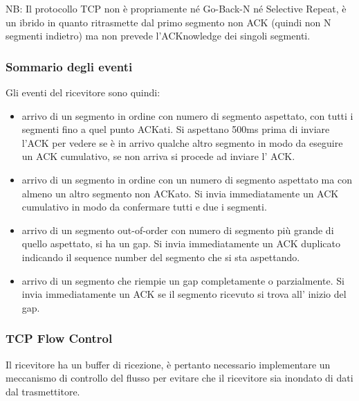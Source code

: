 NB: Il protocollo TCP non è propriamente né Go-Back-N né Selective Repeat, è un ibrido in quanto ritrasmette dal primo segmento non ACK (quindi non N segmenti indietro) ma non prevede l'ACKnowledge dei singoli segmenti.

\subsubsection{Sommario degli eventi}
Gli eventi del ricevitore sono quindi:
\begin{itemize}
    \item arrivo di un segmento in ordine con numero di segmento aspettato, con tutti i segmenti fino a quel punto ACKati.
    Si aspettano 500ms prima di inviare l'ACK per vedere se è in arrivo qualche altro segmento in modo da eseguire un ACK cumulativo, se non arriva si procede ad inviare l' ACK.

    \item arrivo di un segmento in ordine con un numero di segmento aspettato ma con almeno un altro segmento non ACKato.
    Si invia immediatamente un ACK cumulativo in modo da confermare tutti e due i segmenti.

    \item arrivo di un segmento out-of-order con numero di segmento più grande di quello aspettato, si ha un gap.
    Si invia immediatamente un ACK duplicato indicando il sequence number del segmento che si sta aspettando.
    
    \item arrivo di un segmento che riempie un gap completamente o parzialmente.
    Si invia immediatamente un ACK se il segmento ricevuto si trova all' inizio del gap.
\end{itemize}

\subsubsection{TCP Flow Control}
Il ricevitore ha un buffer di ricezione, è pertanto necessario implementare un meccanismo di controllo del flusso per evitare che il ricevitore sia inondato di dati dal trasmettitore.

